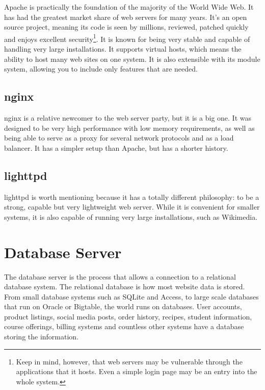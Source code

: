 Apache is practically the foundation of the majority of the World Wide Web.  It has had the greatest market share of web servers for many years.  It's an open source project, meaning its code is seen by millions, reviewed, patched quickly and enjoys excellent security\footnote{Keep in mind, however, that web servers may be vulnerable through the applications that it hosts.  Even a simple login page may be an entry into the whole system.}.  It is known for being very stable and capable of handling very large installations.  It supports virtual hosts, which means the ability to host many web sites on one system.  It is also extensible with its module system, allowing you to include only features that are needed.

\subsection{nginx}

nginx is a relative newcomer to the web server party, but it is a big one.  It was designed to be very high performance with low memory requirements, as well as being able to serve as a proxy for several network protocols and as a load balancer.  It has a simpler setup than Apache, but has a shorter history.

\subsection{lighttpd}

lighttpd is worth mentioning because it has a totally different philosophy: to be a strong, capable but very lightweight web server.  While it is convenient for smaller systems, it is also capable of running very large installations, such as Wikimedia.

\section{Database Server}

The database server is the process that allows a connection to a relational database system.  The relational database is how most website data is stored.  From small database systems such as SQLite and Access, to large scale databases that run on Oracle or Bigtable, the world runs on databases.  User accounts, product listings, social media posts, order history, recipes, student information, course offerings, billing systems and countless other systems have a database storing the information.\\


